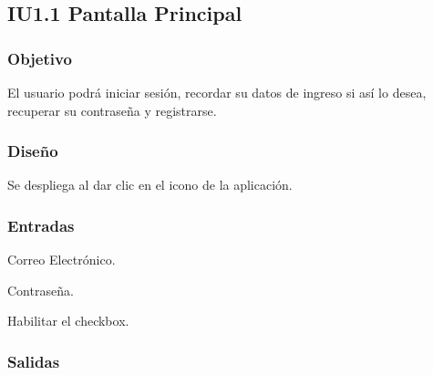 \newpage
\subsection{IU1.1 Pantalla Principal}

\subsubsection{Objetivo}
	El usuario podrá iniciar sesión, recordar su datos de ingreso si así lo desea, recuperar su contraseña y registrarse.  

\subsubsection{Diseño}
	Se despliega al dar clic en el icono de la aplicación.


\subsubsection{Entradas}
\begin{Citemize} 
	\item Correo Electrónico.
	\item Contraseña.
	\item Habilitar el checkbox.
\end{Citemize}

\subsubsection{Salidas}
\begin{Citemize}
	\item {}
	\item {}
	\item {}
	\item {}
\end{Citemize}